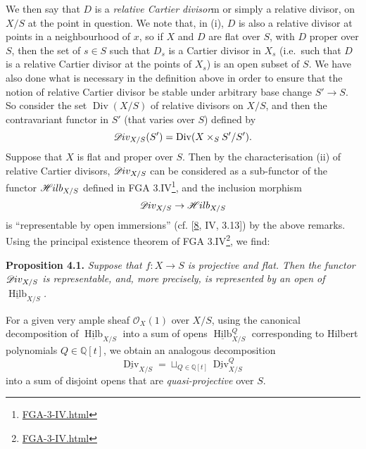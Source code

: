 \documentclass{article}
\renewcommand{\href}[2]{#2\footnote{\url{#1}}}
\newenvironment{itenv}[1]
  {\phantomsection\par\smallskip\noindent\textbf{#1.}\itshape}
  {\par\smallskip}
\newcommand{\oldpage}[1]{\marginpar{\footnotesize$\Big\vert$ \textit{p.~#1}}}
\theoremstyle{definition}
\theoremstyle{definition}
\theoremstyle{definition}
\theoremstyle{definition}
\theoremstyle{remark}
\begin{document}
We then say that \(D\) is a \emph{relative Cartier divisor}m or simply a relative divisor, on \(X/S\) at the point in question.
We note that, in (i), \(D\) is also a relative divisor at points in a neighbourhood of \(x\), so if \(X\) and \(D\) are flat over \(S\), with \(D\) proper over \(S\), then the set of \(s\in S\) such that \(D_s\) is a Cartier divisor in \(X_s\) (i.e.~such that \(D\) is a relative Cartier divisor at the points of \(X_s\)) is an open subset of \(S\).
We have also done what is necessary in the definition above in order to ensure that the notion of relative Cartier divisor be stable under arbitrary base change \(S'\to S\).
So consider the set \(\operatorname{Div}(X/S)\) of relative divisors on \(X/S\), and then the contravariant functor in \(S'\) (that varies over \(S\)) defined by
\[
  \mathscr{D}\kern -.5pt iv_{X/S}(S')
  = \operatorname{Div}(X\times_S S'/S').
\]
Suppose that \(X\) is flat and proper over \(S\).
Then by the characterisation (ii) of relative Cartier divisors, \(\mathscr{D}\kern -.5pt iv_{X/S}\) can be considered as a sub-functor of the functor \(\mathscr{H}\kern -.5pt ilb_{X/S}\) defined in \href{FGA-3-IV.html}{FGA 3.IV}, and the inclusion morphism
\[
  \mathscr{D}\kern -.5pt iv_{X/S}
  \to \mathscr{H}\kern -.5pt ilb_{X/S}
\]
is ``representable by open immersions'' (cf. {[}\protect\hyperlink{ref-Gro1960a}{8}, IV, 3.13{]}) by the above remarks.
Using the principal existence theorem of \href{FGA-3-IV.html}{FGA 3.IV}, we find:

\leavevmode{}%
\begin{itenv}{Proposition 4.1}
Suppose that \(f\colon X\to S\) is projective and flat.
\oldpage{232-10}Then the functor \(\mathscr{D}\kern -.5pt iv_{X/S}\) is representable, and, more precisely, is represented by an open of \(\underline{\operatorname{Hilb}}_{X/S}\).

\end{itenv}

For a given very ample sheaf \({\mathscr{O}}_X(1)\) over \(X/S\), using the canonical decomposition of \(\underline{\operatorname{Hilb}}_{X/S}\) into a sum of opens \(\underline{\operatorname{Hilb}}_{X/S}^Q\) corresponding to Hilbert polynomials \(Q\in\mathbb{Q}[t]\), we obtain an analogous decomposition
\[
  \underline{\operatorname{Div}}_{X/S}
  = \sqcup_{Q\in\mathbb{Q}[t]} \underline{\operatorname{Div}}_{X/S}^Q
\]
into a sum of disjoint opens that are \emph{quasi-projective} over \(S\).
\end{document}
